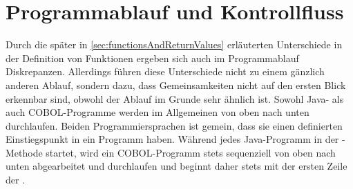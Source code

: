 \section{Programmablauf und Kontrollfluss}\label{programmablauf}
Durch die später in \autoref{sec:functionsAndReturnValues} erläuterten Unterschiede in der Definition von Funktionen ergeben sich auch im Pro\-gramm\-ab\-lauf Diskrepanzen. Allerdings führen diese Unterschiede nicht zu einem gänzlich anderen Ablauf, sondern dazu, dass Gemeinsamkeiten nicht auf den ersten Blick erkennbar sind, obwohl der Ablauf im Grunde sehr ähnlich ist. Sowohl Java- als auch COBOL-Programme werden im Allgemeinen von oben nach unten durchlaufen. Beiden Programmiersprachen ist gemein, dass sie einen definierten Einstiegspunkt in ein Programm haben. Während jedes Java-Programm in der -Methode startet, wird ein COBOL-Programm stets sequenziell von oben nach unten abgearbeitet und durchlaufen und beginnt daher stets mit der ersten Zeile der .






